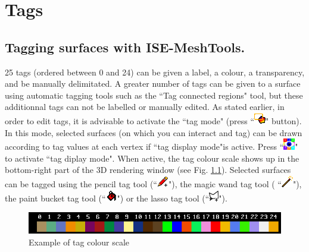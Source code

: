 
\chapter{Tags}
\minitoc 
\section{Tagging surfaces with ISE-MeshTools.}
25 tags (ordered between 0 and 24) can be given
a label, a colour, a transparency, and be manually
delimitated. A greater number of tags can be given
to a surface using automatic tagging tools such as the ``Tag connected regions" tool, but these
additionnal tags can not be labelled or manually edited. As stated earlier, in order to edit tags, it is advisable to activate the ``tag mode" (press ``\includegraphics[scale=0.7]{images/pixmap/Tag_select_mode.png}" button). In this mode, selected surfaces (on which you can interact and tag) can be drawn according to tag values at each vertex if ``tag display mode"is active. Press ``\includegraphics[scale=0.7]{images/pixmap/Show_Tag_Window.png}" to activate ``tag diplay mode". When active, the tag colour scale shows up in the bottom-right part of the 3D rendering window (see Fig. \ref{tag_colour_scale}). Selected surfaces can be tagged using the pencil tag tool (``\includegraphics[scale=0.7]{images/pixmap/pencil.png}"), the magic wand tag tool ( ``\includegraphics[scale=0.7]{images/pixmap/magic_wand.png}"), the paint bucket tag tool (``\includegraphics[scale=0.7]{images/pixmap/Flood_fill.png}") or the lasso tag tool (``\includegraphics[scale=0.7]{images/pixmap/Lasso_plus.png}").

\begin{figure}
  \centering
  \includegraphics[scale=0.5]{images/Tags/Tag_colour_scale.png} 
	\caption{Example of tag colour scale}
\label{tag_colour_scale}
 
\end{figure}



